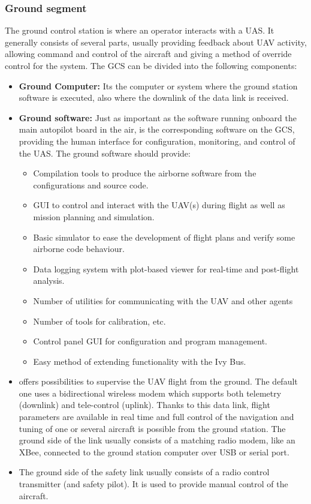 \subsubsection{Ground segment} 
The ground control station is where an operator interacts with a UAS. It generally consists of several parts, usually providing feedback about UAV activity, allowing command and control of the aircraft and giving a method of override control for the system.
The GCS can be divided into the following components:
\begin{itemize}
    \item \textbf{Ground Computer:} Its the computer or system where the ground station software is executed, also where the downlink of the data link is received.
    \item \textbf{Ground software:} Just as important as the software running onboard the main autopilot board in the air, is the corresponding software on the GCS, providing the human interface for configuration, monitoring, and control of the UAS. The ground software should provide:
    \begin{itemize}
        \item Compilation tools to produce the airborne software from the configurations and source code.
        \item GUI to control and interact with the UAV(s) during flight as well as mission planning and simulation.
        \item Basic simulator to ease the development of flight plans and verify some airborne code behaviour.
        \item Data logging system with plot-based viewer for real-time and post-flight analysis.
        \item Number of utilities for communicating with the UAV and other agents
        \item Number of tools for calibration, etc.
        \item Control panel GUI for configuration and program management.
        \item Easy method of extending functionality with the Ivy Bus.
    \end{itemize}
    \item {} offers possibilities to supervise the UAV flight from the ground. The default one uses a bidirectional wireless modem which supports both telemetry (downlink) and tele-control (uplink). Thanks to this data link, flight parameters are available in real time and full control of the navigation and tuning of one or several aircraft is possible from the ground station. The ground side of the link usually consists of a matching radio modem, like an XBee, connected to the ground station computer over USB or serial port.
    \item {} The ground side of the safety link usually consists of a radio control transmitter (and safety pilot). It is used to provide manual control of the aircraft.
\end{itemize}

